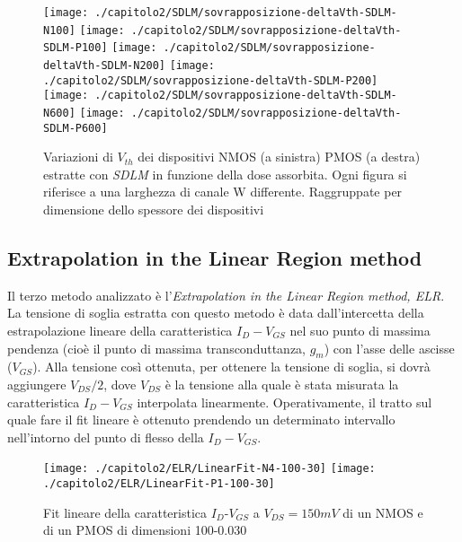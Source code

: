 \begin{figure}[H]
  \centering
  \texttt{[image: ./capitolo2/SDLM/sovrapposizione-deltaVth-SDLM-N100]}
  \texttt{[image: ./capitolo2/SDLM/sovrapposizione-deltaVth-SDLM-P100]}
  \texttt{[image: ./capitolo2/SDLM/sovrapposizione-deltaVth-SDLM-N200]}
  \texttt{[image: ./capitolo2/SDLM/sovrapposizione-deltaVth-SDLM-P200]}
  \texttt{[image: ./capitolo2/SDLM/sovrapposizione-deltaVth-SDLM-N600]}
  \texttt{[image: ./capitolo2/SDLM/sovrapposizione-deltaVth-SDLM-P600]}
  \caption[Dati $\Delta V_{th}$ estratti con SDLM]{Variazioni di $V_{th}$ dei dispositivi NMOS (a sinistra) PMOS (a destra) estratte con \emph{SDLM} in funzione della dose assorbita. Ogni figura si riferisce a una larghezza di canale W differente. Raggruppate per dimensione dello spessore dei dispositivi}
  \label{fig:deltaVthSDLM}
\end{figure}

\subsection[ELR]{Extrapolation in the Linear Region method}
Il terzo metodo analizzato è l'\emph{Extrapolation in the Linear Region method, ELR}\cite{art2}. La tensione di soglia estratta con questo metodo è data dall'intercetta della estrapolazione lineare della caratteristica $I_D-V_{GS}$ nel suo punto di massima pendenza (cioè il punto di massima transconduttanza, $g_m$) con l'asse delle ascisse ($V_{GS}$). Alla tensione così ottenuta, per ottenere la tensione di soglia, si dovrà aggiungere $V_{DS}/2$, dove $V_{DS}$ è la tensione alla quale è stata misurata la caratteristica $I_D-V_{GS}$ interpolata linearmente.
Operativamente, il tratto sul quale fare il fit lineare è ottenuto prendendo un determinato intervallo nell'intorno del punto di flesso della $I_D-V_{GS}$.

\begin{figure}[h!]
  \centering
  \texttt{[image: ./capitolo2/ELR/LinearFit-N4-100-30]}
  \texttt{[image: ./capitolo2/ELR/LinearFit-P1-100-30]}
  \caption[Applicazione ELR]{Fit lineare della caratteristica  $I_D$-$V_{GS}$ a $V_{DS}=150mV$ di un NMOS e di un PMOS di dimensioni 100-0.030 }
\end{figure}

